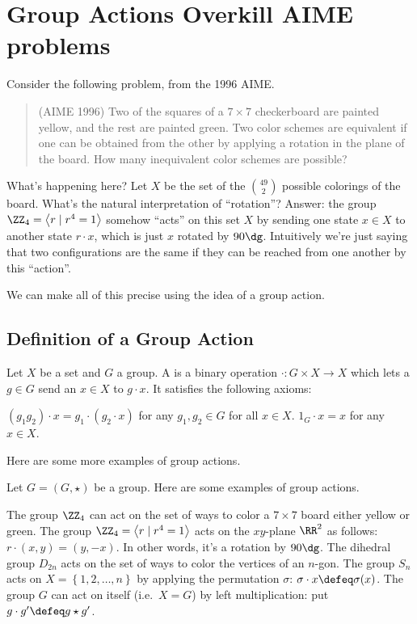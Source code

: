 \chapter{Group Actions Overkill AIME problems}
Consider the following problem, from the 1996 AIME.

\begin{quote}
	(AIME 1996) Two of the squares of a $7 \times 7$ checkerboard are painted yellow, and the rest are painted green. Two color schemes are equivalent if one can be obtained from the other by applying a rotation in the plane of the board. How many inequivalent color schemes are possible?
\end{quote}

What's happening here? Let $X$ be the set of the $\binom{49}{2}$ possible colorings of the board.
What's the natural interpretation of ``rotation''?
Answer: the group $\Zc 4 = \left<r \mid r^4=1\right>$ somehow ``acts'' on this set $X$ by sending one state $x \in X$ to another state $r \cdot x$, which is just $x$ rotated by $90\dg$.
Intuitively we're just saying that two configurations are the same if they can be reached from one another by this ``action''.

We can make all of this precise using the idea of a group action.

\section{Definition of a Group Action}

\begin{definition}
	Let $X$ be a set and $G$ a group.
	A  is a binary operation $\cdot : G \times X \to X$
	which lets a $g \in G$ send an $x \in X$ to $g \cdot x$.
	It satisfies the following axioms:
	\begin{itemize}
		\ii $(g_1g_2) \cdot x = g_1 \cdot (g_2 \cdot x)$ for any $g_1, g_2 \in G$
		for all $x \in X$.
		\ii $1_G \cdot x = x$ for any $x \in X$.
	\end{itemize}
\end{definition}

Here are some more examples of group actions.
\begin{example}
	Let $G=(G,\star)$ be a group.
	Here are some examples of group actions.
	\begin{enumerate}[(a)]
		\ii The group $\Zc 4$ can act on the set of ways to color a $7 \times 7$
		board either yellow or green.
		\ii The group $\Zc4 = \left<r \mid r^4=1\right>$ acts on the $xy$-plane $\RR^2$ as follows: $r \cdot (x,y) = (y,-x)$.
		In other words, it's a rotation by $90\dg$.
		\ii The dihedral group $D_{2n}$ acts on the set of ways to color the vertices of an $n$-gon.
		\ii The group $S_n$ acts on $X = \left\{ 1,2,\dots,n \right\}$
		by applying the permutation $\sigma$: $\sigma \cdot x \defeq \sigma(x)$.
		\ii The group $G$ can act on itself (i.e.\ $X=G$) by left multiplication: put $g \cdot g' \defeq g \star g'$.
	\end{enumerate}
\end{example}

